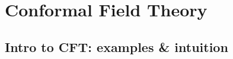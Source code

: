\documentclass[../QFT_main.tex]{subfiles}
\begin{document}
\chapter{Conformal Field Theory} 


\section{Intro to CFT: examples \& intuition} 
\end{document}
